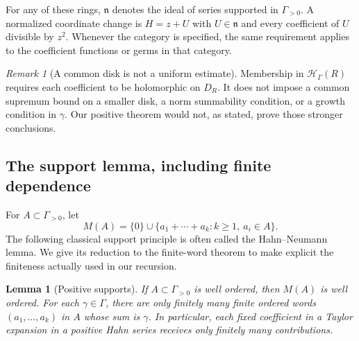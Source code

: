 \documentclass[11pt,a4paper]{article}
\numberwithin{equation}{section}
\newtheorem{lemma}[theorem]{Lemma}
\theoremstyle{definition}
\theoremstyle{remark}
\newtheorem{remark}[theorem]{Remark}
\newcommand{\HH}{\mathcal H}
\newcommand{\nn}{\mathfrak n}
\begin{document}
For any of these rings, $\nn$ denotes the ideal of series supported in
$\Gamma_{>0}$. A normalized coordinate change is
$H=z+U$ with $U\in\nn$ and every coefficient of $U$ divisible by $z^2$.
Whenever the category is specified, the same requirement applies to the
coefficient functions or germs in that category.

\begin{remark}[A common disk is not a uniform estimate]
Membership in $\HH_\Gamma(R)$ requires each coefficient to be holomorphic
on $D_R$. It does not impose a common supremum bound on a smaller disk,
a norm summability condition, or a growth condition in $\gamma$. Our
positive theorem would not, as stated, prove those stronger conclusions.
\end{remark}

\subsection{The support lemma, including finite dependence}

For $A\subset\Gamma_{>0}$, let
\[
 M(A)=\{0\}\cup\{a_1+\cdots+a_k:k\ge1,\ a_i\in A\}.
\]
The following classical support principle is often called the
Hahn--Neumann lemma. We give its reduction to the finite-word theorem to
make explicit the finiteness actually used in our recursion.

\begin{lemma}[Positive supports]\label{lem:neumann}
If $A\subset\Gamma_{>0}$ is well ordered, then $M(A)$ is well ordered.
For each $\gamma\in\Gamma$, there are only finitely many finite ordered
words $(a_1,\ldots,a_k)$ in $A$ whose sum is $\gamma$. In particular,
each fixed coefficient in a Taylor expansion in a positive Hahn series
receives only finitely many contributions.
\end{lemma}
\end{document}
